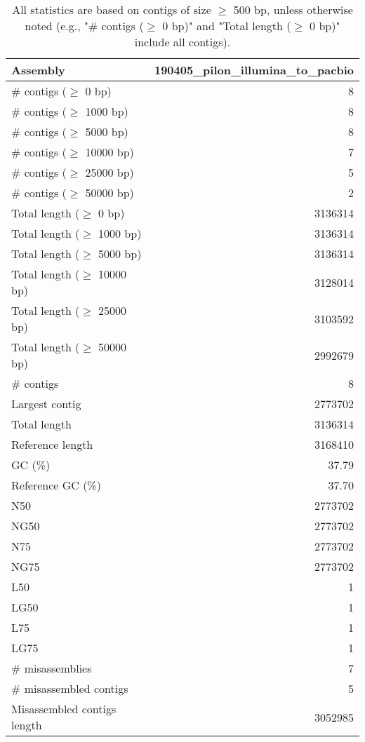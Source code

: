 \documentclass[12pt,a4paper]{article}
\begin{document}
\begin{table}[ht]
\begin{center}
\caption{All statistics are based on contigs of size $\geq$ 500 bp, unless otherwise noted (e.g., "\# contigs ($\geq$ 0 bp)" and "Total length ($\geq$ 0 bp)" include all contigs).}
\begin{tabular}{|l*{1}{|r}|}
\hline
Assembly & 190405\_pilon\_illumina\_to\_pacbio \\ \hline
\# contigs ($\geq$ 0 bp) & 8 \\ \hline
\# contigs ($\geq$ 1000 bp) & 8 \\ \hline
\# contigs ($\geq$ 5000 bp) & 8 \\ \hline
\# contigs ($\geq$ 10000 bp) & 7 \\ \hline
\# contigs ($\geq$ 25000 bp) & 5 \\ \hline
\# contigs ($\geq$ 50000 bp) & 2 \\ \hline
Total length ($\geq$ 0 bp) & 3136314 \\ \hline
Total length ($\geq$ 1000 bp) & 3136314 \\ \hline
Total length ($\geq$ 5000 bp) & 3136314 \\ \hline
Total length ($\geq$ 10000 bp) & 3128014 \\ \hline
Total length ($\geq$ 25000 bp) & 3103592 \\ \hline
Total length ($\geq$ 50000 bp) & 2992679 \\ \hline
\# contigs & 8 \\ \hline
Largest contig & 2773702 \\ \hline
Total length & 3136314 \\ \hline
Reference length & 3168410 \\ \hline
GC (\%) & 37.79 \\ \hline
Reference GC (\%) & 37.70 \\ \hline
N50 & 2773702 \\ \hline
NG50 & 2773702 \\ \hline
N75 & 2773702 \\ \hline
NG75 & 2773702 \\ \hline
L50 & 1 \\ \hline
LG50 & 1 \\ \hline
L75 & 1 \\ \hline
LG75 & 1 \\ \hline
\# misassemblies & 7 \\ \hline
\# misassembled contigs & 5 \\ \hline
Misassembled contigs length & 3052985 \\ \hline

\end{tabular}
\end{center}
\end{table}
\end{document}
